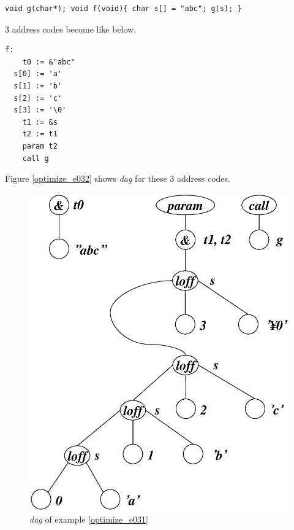 \begin{Example}
\label{optimize_e031}
\begin{verbatim}
void g(char*); void f(void){ char s[] = "abc"; g(s); }
\end{verbatim}
3 address codes become like below.
\begin{verbatim}
f:
    t0 := &"abc"
  s[0] := 'a'
  s[1] := 'b'
  s[2] := 'c'
  s[3] := '\0'
    t1 := &s
    t2 := t1
    param t2
    call g
\end{verbatim}
Figure \ref{optimize_e032} shows {\em dag} for these 3 address codes.
\begin{figure}[htbp]
\begin{center}
\includegraphics[width=1.0\linewidth,height=1.2\linewidth]{opt016.eps}
\caption{{\em dag} of example \ref{optimize_e031}}

\end{center}
\end{figure}
\end{Example}

